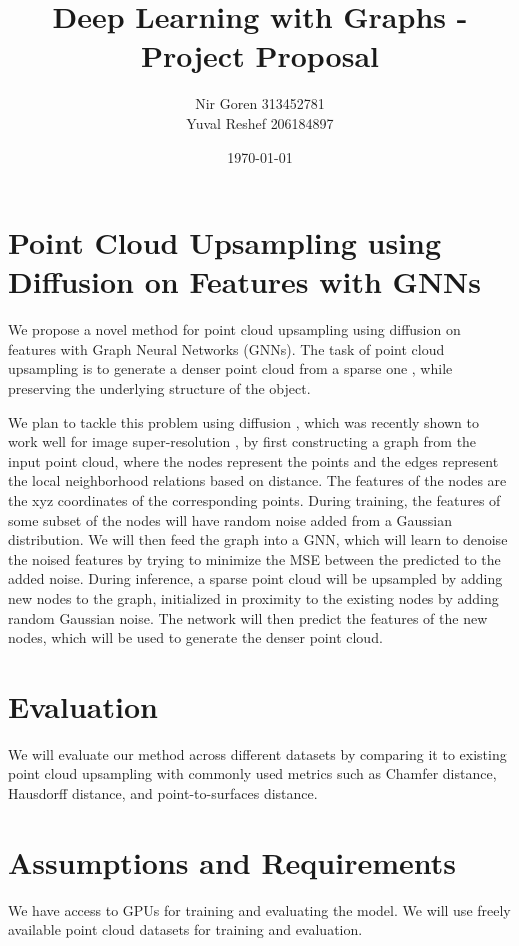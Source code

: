 \documentclass{article}
\title{Deep Learning with Graphs - Project Proposal}
\author{Nir Goren 313452781 \\ Yuval Reshef 206184897}
\date{\today}
\begin{document}
\maketitle

\section{Point Cloud Upsampling using Diffusion on Features with GNNs}
We propose a novel method for point cloud upsampling using diffusion on features with Graph Neural Networks (GNNs).
The task of point cloud upsampling is to generate a denser point cloud from a sparse one \cite{PU-GCN,Qu_2024_CVPR}, while preserving the underlying structure of the object.

We plan to tackle this problem using diffusion \cite{ConGNN_2024}, which was recently shown to work well for image super-resolution \cite{yue2023resshift}, by first constructing a graph from the input point cloud, where the nodes represent the points and the edges represent the local neighborhood relations based on distance.
The features of the nodes are the xyz coordinates of the corresponding points. During training, the features of some subset of the nodes will have random noise added from a Gaussian distribution.
We will then feed the graph into a GNN, which will learn to denoise the noised features by trying to minimize the MSE between the predicted to the added noise. During inference, a sparse point cloud will be upsampled by adding new nodes to the graph, initialized in proximity to the existing nodes by adding random Gaussian noise. The network will then predict the features of the new nodes, which will be used to generate the denser point cloud.

\section{Evaluation}
We will evaluate our method across different datasets by comparing it to existing point cloud upsampling with commonly used metrics such as Chamfer distance, Hausdorff distance, and point-to-surfaces distance.

\section{Assumptions and Requirements}
We have access to GPUs for training and evaluating the model. We will use freely available point cloud datasets for training and evaluation.

\printbibliography
\end{document}
